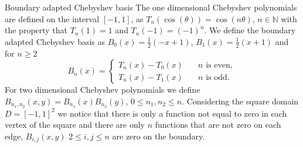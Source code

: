 \documentclass{beamer}
\newcommand{\numberset}{\mathbb}
\newcommand{\N}{\numberset{N}}
\begin{document}
\begin{frame}{Boundary adapted Chebyshev basis}
	The one dimensional Chebyshev polynomials are defined on the interval $ [-1, 1] $, as $T_n(\cos(\theta)) = \cos(n\theta)$, $n \in \N$ with the property that $T_n(1) = 1$ and $T_n(-1) = (-1)^n$. We define the boundary adapted Chebyshev basis as $B_0(x) = \frac12(-x+1)$, $B_1(x) = \frac12(x+1)$ and for $n \ge 2$
	\[ B_n(x) = \begin{cases}
			T_n(x) - T_0(x) \quad & n \text{ is even}, \\
			T_n(x) - T_1(x) \quad & n \text{ is odd}.
		\end{cases} \]
	\pause
	For two dimensional Chebyshev polynomials we define $B_{n_1, n_2}(x, y) = B_{n_1}(x)B_{n_2}(y)$, $ 0 \le n_1, n_2 \le n$. Considering the square domain $D = [-1, 1]^2$ we notice that there is only a function not equal to zero in each vertex of the square and there are only $n$ functions that are not zero on each edge, $B_{i,j}(x,y) $ $ 2\le i,j \le n$ are zero on the boundary.
\end{frame}

\end{document}
